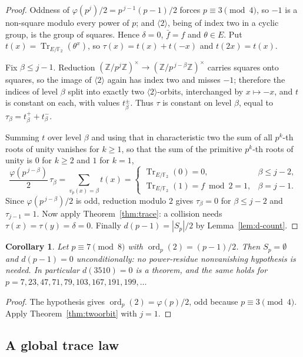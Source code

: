 \documentclass[a4paper]{article}
\newtheorem{corollary}[theorem]{Corollary}
\newcommand{\F}{\mathbb{F}}
\newcommand{\Z}{\mathbb{Z}}
\newcommand{\ord}[2][]{\operatorname{ord}_{#1}\!\left(#2\right)}
\newcommand{\abs}[1]{\left|#1\right|}
\DeclareMathOperator{\Tr}{Tr}
\begin{document}
\begin{proof}
	Oddness of $\varphi(p^j)/2=p^{\,j-1}(p-1)/2$ forces $p\equiv3\pmod4$,
	so $-1$ is a non-square modulo every power of $p$; and
	$\langle2\rangle$, being of index two in a cyclic group, is the group
	of squares.  Hence $\delta=0$, $\bar f=f$ and $\theta\in E$.  Put
	$t(x)=\Tr_{E/\F_2}(\theta^{x})$, so $\tau(x)=t(x)+t(-x)$ and
	$t(2x)=t(x)$.

	Fix $\beta\leq j-1$.  Reduction
	$(\Z/p^{j}\Z)^{\times}\to(\Z/p^{\,j-\beta}\Z)^{\times}$ carries squares
	onto squares, so the image of $\langle2\rangle$ again has index two and
	misses $-1$; therefore the indices of level $\beta$ split into exactly
	two $\langle2\rangle$-orbits, interchanged by $x\mapsto-x$, and $t$ is
	constant on each, with values $t_\beta^{\pm}$.  Thus $\tau$ is constant
	on level $\beta$, equal to $\tau_\beta=t_\beta^{+}+t_\beta^{-}$.

	Summing $t$ over level $\beta$ and using that in characteristic two the
	sum of all $p^{k}$-th roots of unity vanishes for $k\geq1$, so that the
	sum of the primitive $p^{k}$-th roots of unity is $0$ for $k\geq2$ and
	$1$ for $k=1$,
	\[
		\frac{\varphi(p^{\,j-\beta})}{2}\,\tau_\beta
		=\sum_{v_p(x)=\beta}t(x)
		=\begin{cases}
			\Tr_{E/\F_2}(0)=0,&\beta\leq j-2,\\
			\Tr_{E/\F_2}(1)=f\bmod 2=1,&\beta=j-1 .
		\end{cases}
	\]
	Since $\varphi(p^{\,j-\beta})/2$ is odd, reduction modulo $2$ gives
	$\tau_\beta=0$ for $\beta\leq j-2$ and $\tau_{j-1}=1$.
	Now apply Theorem~\ref{thm:trace}: a collision needs
	$\tau(x)=\tau(y)=\delta=0$.
	Finally $d(p-1)=\abs{S_p}/2$ by Lemma~\ref{lem:d-count}.
\end{proof}

\begin{corollary}\label{cor:trace-family}
	Let $p\equiv7\pmod 8$ with $\ord[p]{2}=(p-1)/2$.  Then
	$S_p=\emptyset$ and $d(p-1)=0$ \emph{unconditionally}: no
	power-residue nonvanishing hypothesis is needed.
	In particular $d(3510)=0$ is a theorem, and the same holds for
	$p=7,23,47,71,79,103,167,191,199,\ldots$
\end{corollary}

\begin{proof}
	The hypothesis gives $\ord[p]{2}=\varphi(p)/2$, odd because
	$p\equiv3\pmod4$.  Apply Theorem~\ref{thm:twoorbit} with $j=1$.
\end{proof}

\subsection{A global trace law}
\end{document}
